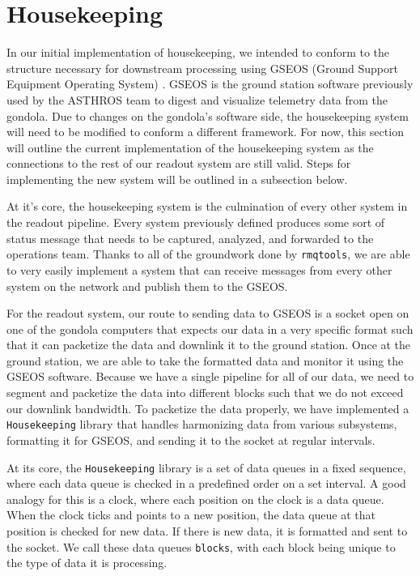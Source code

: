 \section{Housekeeping}
In our initial implementation of housekeeping, we intended to conform to the structure necessary for downstream processing using GSEOS (Ground Support Equipment Operating System) \parencite{hauck2003use}.
GSEOS is the ground station software previously used by the ASTHROS team to digest and visualize telemetry data from the gondola.
Due to changes on the gondola's software side, the housekeeping system will need to be modified to conform a different framework.
For now, this section will outline the current implementation of the housekeeping system as the connections to the rest of our readout system are still valid. 
Steps for implementing the new system will be outlined in a subsection below.

At it's core, the housekeeping system is the culmination of every other system in the readout pipeline.
Every system previously defined produces some sort of status message that needs to be captured, analyzed, and forwarded to the operations team.
Thanks to all of the groundwork done by \texttt{rmqtools}, we are able to very easily implement a system that can receive messages from every other system on the network and publish them to the GSEOS. 

For the readout system, our route to sending data to GSEOS is a socket open on one of the gondola computers that expects our data in a very specific format such that it can packetize the data and downlink it to the ground station.
Once at the ground station, we are able to take the formatted data and monitor it using the GSEOS software.
Because we have a single pipeline for all of our data, we need to segment and packetize the data into different blocks such that we do not exceed our downlink bandwidth.
To packetize the data properly, we have implemented a \texttt{Housekeeping} library that handles harmonizing data from various subsystems, formatting it for GSEOS, and sending it to the socket at regular intervals. 

At its core, the \texttt{Housekeeping} library is a set of data queues in a fixed sequence, where each data queue is checked in a predefined order on a set interval.
A good analogy for this is a clock, where each position on the clock is a data queue.
When the clock ticks and points to a new position, the data queue at that position is checked for new data.
If there is new data, it is formatted and sent to the socket.
We call these data queues \texttt{blocks}, with each block being unique to the type of data it is processing.

